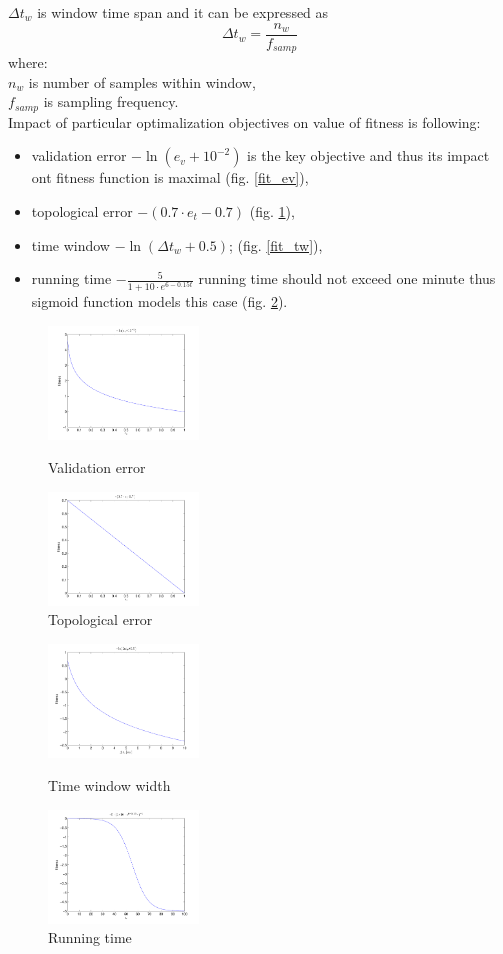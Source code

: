 \documentclass[a4paper]{IEEEtran}
\begin{document}
$ \Delta t_w $ is window time span and it can be expressed as 
\[  \Delta t_w = \frac{n_w}{f_{samp}}  \]
where:\\
$ n_w $ is number of samples within window,\\
$ f_{samp} $ is sampling frequency.
\\
Impact of particular optimalization objectives on value of fitness is following:
\begin{itemize}
	\item validation error $ -\ln(e_v+10^{-2 }) $ is the key objective and thus its impact
	ont fitness function is maximal (fig. \ref{fit_ev}),
	\item topological error $ -(0.7\cdot e_t-0.7) $ (fig. \ref{fit_et}),
	\item time window $ -\ln(\Delta t_w+0.5) $; (fig. \ref{fit_tw}),
	\item running time $ -\frac{5}{1+10\cdot e^{6-0.15t}} $ running
	time should not exceed one minute thus sigmoid function models this case (fig.
	 \ref{fit_tr}).
\end{itemize}


\begin{figure}[h] %
	\centering
	\parbox{40mm}{
		\includegraphics[width=40mm]{fit_ev}
		\caption{Validation error}
		\label{fit_ev}
	}
	\qquad
	\parbox{40mm}{
		\includegraphics[width=40mm]{fit_et}
		\caption{Topological error}
		\label{fit_et}
	}
\end{figure}
\begin{figure}[h] %
	\parbox{40mm}{
		\includegraphics[width=40mm]{fit_tw}
		\caption{Time window width}
		\label{fit_tw}
	}
	\qquad
	\parbox{40mm}{
		\includegraphics[width=40mm]{fit_tr}
		\caption{Running time}
		\label{fit_tr}
	}
\end{figure}
\end{document}
